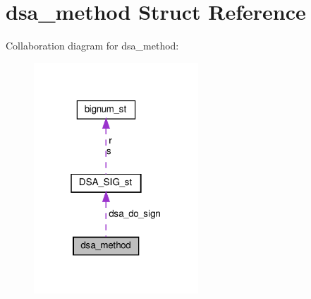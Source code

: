 \hypertarget{structdsa__method}{}\section{dsa\+\_\+method Struct Reference}
\label{structdsa__method}


Collaboration diagram for dsa\+\_\+method\+:
\nopagebreak
\begin{figure}[H]
\begin{center}
\leavevmode
\includegraphics[width=175pt]{structdsa__method__coll__graph}
\end{center}
\end{figure}
